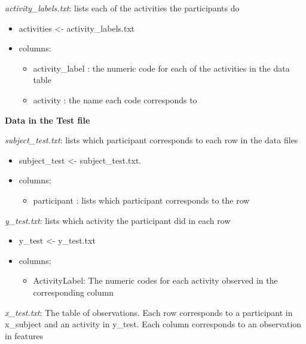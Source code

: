 \documentclass[
]{article}
\providecommand{\tightlist}{%
  \setlength{\itemsep}{0pt}\setlength{\parskip}{0pt}}
\begin{document}
\emph{activity\_labels.txt}: lists each of the activities the
participants do

\begin{itemize}
\tightlist
\item
  activities \textless- activity\_labels.txt\\
\item
  columns:

  \begin{itemize}
  \tightlist
  \item
    activity\_label : the numeric code for each of the activities in the
    data table\\
  \item
    activity : the name each code corresponds to
  \end{itemize}
\end{itemize}

\textbf{Data in the Test file}

\emph{subject\_test.txt}: lists which participant corresponds to each
row in the data files

\begin{itemize}
\tightlist
\item
  subject\_test \textless- subject\_test.txt.
\item
  columns:

  \begin{itemize}
  \tightlist
  \item
    participant : lists which participant corresponds to the row
  \end{itemize}
\end{itemize}

\emph{y\_test.txt}: lists which activity the participant did in each row

\begin{itemize}
\tightlist
\item
  y\_test \textless- y\_test.txt\\
\item
  columns:

  \begin{itemize}
  \tightlist
  \item
    ActivityLabel: The numeric codes for each activity observed in the
    corresponding column
  \end{itemize}
\end{itemize}

\emph{x\_test.txt}: The table of observations. Each row corresponds to a
participant in x\_subject and an activity in y\_test. Each column
corresponds to an observation in features
\end{document}
